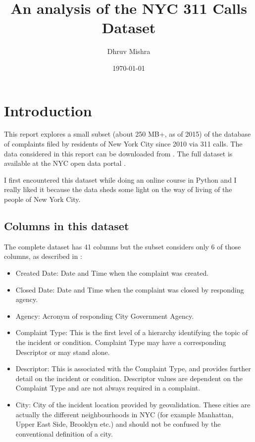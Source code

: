 \documentclass[12pt,a4paper]{article}
\begin{document}
\title{An analysis of the NYC 311 Calls Dataset}
\author{Dhruv Mishra}
\date{\today}

\maketitle


\vspace{+10mm}
\tableofcontents


\vspace{+10mm}
\section{Introduction}
This report explores a small subset (about 250 MB+, as of 2015) of the database of complaints filed by residents of New York City since 2010 via 311 calls. The data considered in this report can be downloaded from \cite{subset}. The full dataset is available at the NYC open data portal \cite{nycdatafull}.

I first encountered this dataset while doing an online course in Python and I really liked it because the data sheds some light on the way of living of the people of New York City.

\subsection{Columns in this dataset}
The complete dataset has 41 columns but the subset considers only 6 of those columns, as described in \cite{nycdatafull}:
\begin{itemize}
    \item Created Date: Date and Time when the complaint was created.
    \item Closed Date: Date and Time when the complaint was closed by responding agency.
    \item Agency: Acronym of responding City Government Agency.
    \item Complaint Type: This is the first level of a hierarchy identifying the topic of the incident or condition. Complaint Type may have a corresponding Descriptor or may stand alone.
    \item Descriptor: This is associated with the Complaint Type, and provides further detail on the incident or condition. Descriptor values are dependent on the Complaint Type and are not always required in a complaint.
    \item City: City of the incident location provided by geovalidation. These cities are actually the different neighbourhoods in NYC (for example Manhattan, Upper East Side, Brooklyn etc.) and should not be confused by the conventional definition of a city.
\end{itemize}
\end{document}
